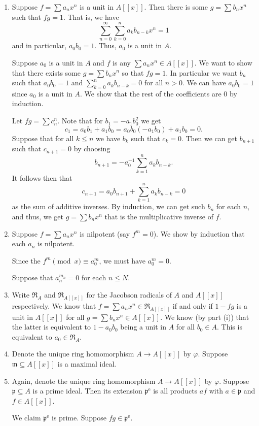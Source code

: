 \documentclass[12 pt, letterpaper]{hmcpset}
\begin{document}
\begin{solution}
	\begin{enumerate}
		\item Suppose $f = \sum a_{n} x^{n}$ is a unit in $A[[x]]$. Then there is some $g = \sum b_{n} x^{n}$ such that $fg = 1$. That is, we have
			\[
				\sum_{n = 0}^{\infty} \sum_{k = 0}^{n} a_{k} b_{n - k} x^{n} = 1
			\]
			and in particular, $a_{0} b_{0} = 1$. Thus, $a_{0}$ is a unit in $A$.

			Suppose $a_{0}$ is a unit in $A$ and $f$ is any $\sum a_{n} x^{n} \in A[[x]]$. We want to show that there exists some $g = \sum b_{n} x^{n}$ so that $fg = 1$. In particular we want $b_{n}$ such that $a_{0} b_{0} = 1$ and $\sum_{k = 0}^{n} a_{k} b_{n - k} = 0$ for all $n > 0$. We can have $a_{0} b_{0} = 1$ since $a_{0}$ is a unit in $A$. We show that the rest of the coefficients are $0$ by induction. 

			Let $fg = \sum c_{n} ^{n}$. Note that for $b_{1} = - a_{1} b_{0}^{2}$ we get
			\[
				c_{1} = a_{0} b_{1} + a_{1} b_{0} = a_{0} b_{0} (-a_{1} b_{0}) + a_{1} b_{0} = 0.
			\]
			Suppose that for all $k \le n$ we have $b_{k}$ such that $c_{k} = 0$. Then we can get $b_{n + 1}$ such that $c_{n + 1} = 0$ by choosing
			\[
				b_{n + 1} = - a_{0}^{-1} \sum_{k = 1}^{n} a_{k} b_{n - k}.
			\]
			It follows then that
			\[
				c_{n + 1} = a_{0} b_{n + 1} + \sum_{k = 1}^{n} a_{k} b_{n - k} = 0
			\]
			as the sum of additive inverses. By induction, we can get such $b_{n}$ for each $n$, and thus, we get $g = \sum b_{n} x^{n}$ that is the multiplicative inverse of $f$.

		\item Suppose $f = \sum a_{n} x^{n}$ is nilpotent (say $f^{m} = 0$). We show by induction that each $a_{n}$ is nilpotent. 

			Since the $f^{m} \pmod{x} \equiv a_{0}^{m}$, we must have $a_{0}^{m} = 0$.

			Suppose that $a_{n}^{m_{n}} = 0$ for each $n \le N$.

		\item Write $\mathfrak{R}_{A}$ and $\mathfrak{R}_{A[[x]]}$ for the Jacobson radicals of $A$ and $A[[x]]$ respectively. We know that $f = \sum a_{n} x^{n} \in \mathfrak{R}_{A[[x]]}$ if and only if $1 - fg$ is a unit in $A[[x]]$ for all $g = \sum b_{n} x^{n} \in A[[x]]$. We know (by part (i)) that the latter is equivalent to $1 - a_{0} b_{0}$ being a unit in $A$ for all $b_{0} \in A$. This is equivalent to $a_{0} \in \mathfrak{R}_{A}$.

		\item Denote the unique ring homomorphism $A \to A[[x]]$ by $\varphi$. Suppose $\mathfrak{m} \subseteq A[[x]]$ is a maximal ideal.

		\item Again, denote the unique ring homomorphism $A \to A[[x]]$ by $\varphi$. Suppose $\mathfrak{p} \subseteq A$ is a prime ideal. Then its extension $\mathfrak{p}^{\text{e}}$ is all products $a f$ with $a \in \mathfrak{p}$ and $f \in A[[x]]$. 

			We claim $\mathfrak{p}^{\text{e}}$ is prime. Suppose $f g \in \mathfrak{p}^{\text{e}}$.
	\end{enumerate}
\end{solution}
\end{document}
